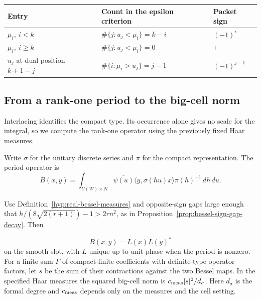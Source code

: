 \begin{construction}
\begin{tabular}{@{}lll@{}}\toprule
Entry & Count in the epsilon criterion & Packet sign\\\midrule
\(\mu_i,\ i<k\) & \(\#\{j:u_j<\mu_i\}=k-i\) & \((-1)^i\)\\
\(\mu_i,\ i\ge k\) & \(\#\{j:u_j<\mu_i\}=0\) & \(1\)\\
\(u_j\) at dual position \(k+1-j\) & \(\#\{i:\mu_i>u_j\}=j-1\) & \((-1)^{j-1}\)\\\bottomrule
\end{tabular}
\caption{Component signs for even \(k\) under strict interlacing, with the remaining large-group entries below \(u_k\). The compact-dual counts determine each gap between adjacent \(u_j\).}\label{fig:interlacing-sign-counts}
\end{construction}

\subsection{From a rank-one period to the big-cell norm}

Interlacing identifies the compact type. Its occurrence alone gives no scale for the integral, so we compute the rank-one operator using the previously fixed Haar measures.

Write \(\sigma\) for the unitary discrete series and \(\pi\) for
the compact representation. The period operator is
\[
 B(x,y)=\int_{U(W)\times N}
 \overline{\psi(u)}\langle y,\sigma(hu)x\rangle\pi(h)^{-1}\,dh\,du.
\]
\begin{proposition}\label{prop:real-period-norm}
Use Definition~\ref{hyp:real-bessel-measures} and opposite-sign gaps
large enough that \(h/(8\sqrt{2(r+1)})-1>2rn^2\), as in
Proposition~\ref{prop:bessel-sign-gap-decay}. Then

\[
 B(x,y)=L(x)L(y)^*
\]
 on the smooth slot, with \(L\) unique up to unit phase when the period is
nonzero. For a finite sum \(F\) of compact-finite coefficients with
definite-type operator factors, let \(s\) be the sum of their
contractions against the two Bessel maps. In the specified Haar
measures the squared big-cell norm is \(c_{\rm meas}|s|^2/d_\sigma\).
Here \(d_\sigma\) is the formal degree and \(c_{\rm meas}\) depends
only on the measures and the cell setting.
\end{proposition}


